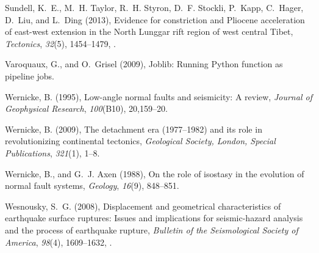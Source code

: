 \documentclass[draft,grl]{AGUTeX}
\begin{document}
\begin{article}
\begin{thebibliography}{32}
Sundell, K.~E., M.~H. Taylor, R.~H. Styron, D.~F. Stockli, P.~Kapp, C.~Hager,
  D.~Liu, and L.~Ding (2013), Evidence for constriction and {P}liocene
  acceleration of east-west extension in the {North Lunggar} rift region of
  west central {T}ibet, \textit{Tectonics}, \textit{32}(5), 1454--1479,
  .

Varoquaux, G., and O.~Grisel (2009), {J}oblib: {R}unning {P}ython function as
  pipeline jobs.

Wernicke, B. (1995), Low-angle normal faults and seismicity: A review,
  \textit{Journal of Geophysical Research}, \textit{100}(B10), 20,159--20.

Wernicke, B. (2009), The detachment era (1977--1982) and its role in
  revolutionizing continental tectonics, \textit{Geological Society, London,
  Special Publications}, \textit{321}(1), 1--8.

Wernicke, B., and G.~J. Axen (1988), On the role of isostasy in the evolution
  of normal fault systems, \textit{Geology}, \textit{16}(9), 848--851.

Wesnousky, S.~G. (2008), Displacement and geometrical characteristics of
  earthquake surface ruptures: Issues and implications for seismic-hazard
  analysis and the process of earthquake rupture, \textit{Bulletin of the
  Seismological Society of America}, \textit{98}(4), 1609--1632,
  .

\end{thebibliography}



\end{article}
\end{document}
